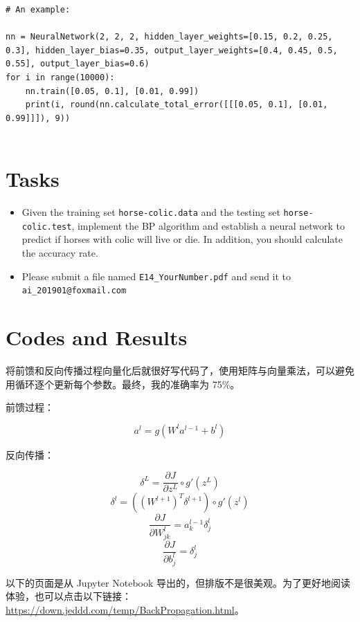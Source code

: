 \documentclass[a4paper, 11pt]{article}
\begin{document}
\begin{enumerate}
\begin{lstlisting}
# An example:

nn = NeuralNetwork(2, 2, 2, hidden_layer_weights=[0.15, 0.2, 0.25, 0.3], hidden_layer_bias=0.35, output_layer_weights=[0.4, 0.45, 0.5, 0.55], output_layer_bias=0.6)
for i in range(10000):
    nn.train([0.05, 0.1], [0.01, 0.99])
    print(i, round(nn.calculate_total_error([[[0.05, 0.1], [0.01, 0.99]]]), 9))


	\end{lstlisting}

\end{enumerate}
\section{Tasks}
\begin{itemize}
	\item Given the training set \texttt{horse-colic.data} and the testing set \texttt{horse-colic.test}, implement the BP algorithm and establish a neural network to predict if horses with colic will live or die. In addition, you should calculate the accuracy rate.
	\item Please submit a file named \texttt{E14\_YourNumber.pdf} and send it to \texttt{ai\_201901@foxmail.com}
\end{itemize}
\section{Codes and Results}

将前馈和反向传播过程向量化后就很好写代码了，使用矩阵与向量乘法，可以避免用循环逐个更新每个参数。最终，我的准确率为 75\%。

前馈过程：

$$
a^l=g(W^l a^{l-1}+b^l)
$$

反向传播：

$$
\delta^L=\dfrac{\partial J}{\partial z^L}\circ g'(z^L)
$$
$$
\delta^l=((W^{l+1})^T \delta^{l+1})\circ g'(z^l)
$$
$$
\dfrac{\partial J}{\partial W^l_{jk}}=a_k^{l-1}\delta_j^l
$$
$$
\dfrac{\partial J}{\partial b_j^l}=\delta_j^l
$$


以下的页面是从 Jupyter Notebook 导出的，但排版不是很美观。为了更好地阅读体验，也可以点击以下链接：\href{https://down.jeddd.com/temp/BackPropagation.html}{https://down.jeddd.com/temp/BackPropagation.html}。




%
%
\end{document}

